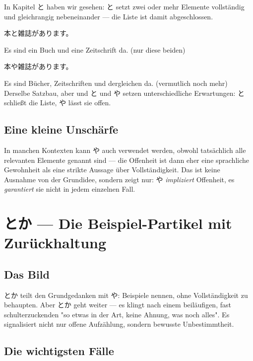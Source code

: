 \documentclass[12pt]{book}
\begin{document}
In Kapitel と haben wir gesehen: と setzt zwei oder mehr Elemente vollständig und gleichrangig nebeneinander — die Liste ist damit abgeschlossen.

\par\quad 本と雑誌があります。\\
\par\quad Es sind ein Buch und eine Zeitschrift da. (nur diese beiden)\\

\par\quad 本や雑誌があります。\\
\par\quad Es sind Bücher, Zeitschriften und dergleichen da. (vermutlich noch mehr)\\

Derselbe Satzbau, aber und と und や setzen unterschiedliche Erwartungen: と schließt die Liste, や lässt sie offen.

\section*{Eine kleine Unschärfe}

In manchen Kontexten kann や auch verwendet werden, obwohl tatsächlich alle relevanten Elemente genannt sind — die Offenheit ist dann eher eine sprachliche Gewohnheit als eine strikte Aussage über Vollständigkeit. Das ist keine Ausnahme von der Grundidee, sondern zeigt nur: や \emph{impliziert} Offenheit, es \emph{garantiert} sie nicht in jedem einzelnen Fall.


\chapter{とか — Die Beispiel-Partikel mit Zurückhaltung}

\section*{Das Bild}

とか teilt den Grundgedanken mit や: Beispiele nennen, ohne Vollständigkeit zu behaupten. Aber とか geht weiter — es klingt nach einem beiläufigen, fast schulterzuckenden "so etwas in der Art, keine Ahnung, was noch alles". Es signalisiert nicht nur offene Aufzählung, sondern bewusste Unbestimmtheit.

\section*{Die wichtigsten Fälle}
\end{document}
